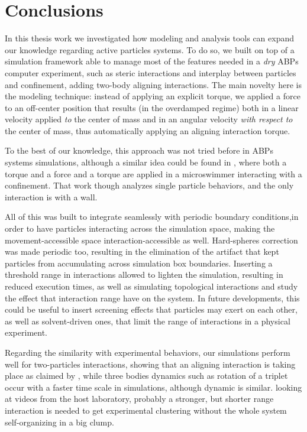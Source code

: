 \documentclass[../../master_thesis_np.tex]{subfiles}
\begin{document}
\chapter{Conclusions}
In this thesis work we investigated how modeling and analysis tools can expand our knowledge regarding active particles systems.
To do so, we built on top of a simulation framework able to manage most of the features needed in a \emph{dry} ABPs computer experiment, such as steric interactions and interplay between particles and confinement, adding two-body aligning interactions.
The main novelty here is the modeling technique: instead of applying an explicit torque, we applied a force to an off-center position that results (in the overdamped regime) both in a linear velocity applied \emph{to} the center of mass and in an angular velocity \emph{with respect to} the center of mass, thus automatically applying an aligning interaction torque.

{\color{blue} To the best of our knowledge, this approach was not tried before in ABPs systems simulations, although a similar idea could be found in \cite{ostapenko_curvature-guided_2018}, where both a torque and a force and a torque are applied in a microswimmer interacting with a confinement.
That work though analyzes single particle behaviors, and the only interaction is with a wall.}

All of this was built to integrate seamlessly with periodic boundary conditions,in order to have particles interacting across the simulation space, making the movement-accessible space interaction-accessible as well.
Hard-spheres correction was made periodic too, resulting in the elimination of the artifact that kept particles from accumulating across simulation box boundaries.
Inserting a threshold range in interactions allowed to lighten the simulation, resulting in reduced execution times, as well as simulating topological interactions and study the effect that interaction range have on the system.
In future developments, this could be useful to insert screening effects that particles may exert on each other, as well as solvent-driven ones, that limit the range of interactions in a physical experiment.

Regarding the similarity with experimental behaviors, our simulations perform well for two-particles interactions, showing that an aligning interaction is taking place as claimed by \cite{singh_pair_2024}, while three bodies dynamics such as rotation of a triplet occur with a faster time scale in simulations, although dynamic is similar.
looking at videos from the host laboratory, probably a stronger, but shorter range interaction is needed to get experimental clustering without the whole system self-organizing in a big clump.
\end{document}
